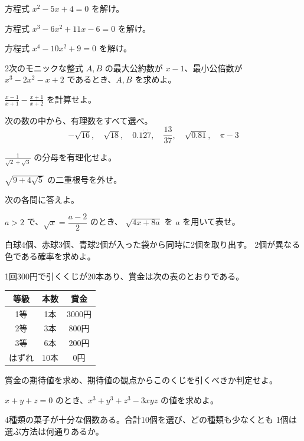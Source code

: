 \documentclass[paper=b5,fontsize=10pt]{jlreq}
\begin{document}
\vspace{\baselineskip}
\begin{densemondai}
  \item 方程式 $x^2-5x+4=0$ を解け。
  \item 方程式 $x^3-6x^2+11x-6=0$ を解け。
  \item 方程式 $x^4-10x^2+9=0$ を解け。
  \item 2次のモニックな整式 $A,B$ の最大公約数が $x-1$、最小公倍数が
        $x^3-2x^2-x+2$ であるとき、$A,B$ を求めよ。
  \item $\displaystyle\frac{x-1}{x+1}-\frac{x+1}{x+2}$ を計算せよ。
  \item 次の数の中から、有理数をすべて選べ。
  \[
    -\sqrt{16},\quad \sqrt{18},\quad 0.1\dot{2}\dot{7},\quad
    \frac{13}{37},\quad \sqrt{0.81},\quad \pi-3
  \]
  \item $\displaystyle\frac{1}{\sqrt2+\sqrt3}$ の分母を有理化せよ。
  \item $\sqrt{9+4\sqrt5}$ の二重根号を外せ。
\end{densemondai}

\ScratchPage

\newpage
{}
次の各問に答えよ。

\vspace{\baselineskip}
\begin{mondai}
  \item $a>2$ で、$\sqrt{x}=\dfrac{a-2}{2}$ のとき、
        $\sqrt{4x+8a}$ を $a$ を用いて表せ。
  \item 白球4個、赤球3個、青球2個が入った袋から同時に2個を取り出す。
        2個が異なる色である確率を求めよ。
  \item 1回300円で引くくじが20本あり、賞金は次の表のとおりである。
  \begin{center}
    \renewcommand{\arraystretch}{1.25}
    \begin{tabular}{c|c|c}
      \hline
      等級 & 本数 & 賞金 \\\hline
      1等 & 1本 & 3000円 \\
      2等 & 3本 & 800円 \\
      3等 & 6本 & 200円 \\
      はずれ & 10本 & 0円 \\\hline
    \end{tabular}
  \end{center}
  賞金の期待値を求め、期待値の観点からこのくじを引くべきか判定せよ。
  \item $x+y+z=0$ のとき、$x^3+y^3+z^3-3xyz$ の値を求めよ。
  \item 4種類の菓子が十分な個数ある。合計10個を選び、どの種類も少なくとも
        1個は選ぶ方法は何通りあるか。
\end{mondai}
\end{document}
